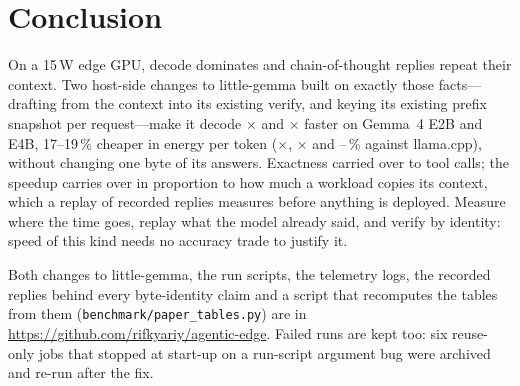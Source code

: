 \documentclass[lettersize,journal]{IEEEtran}
\newcommand{\lc}{llama.cpp}
\newcommand{\lgm}{little-gemma}
\begin{document}
\section{Conclusion}
On a 15\,W edge GPU, decode dominates and chain-of-thought replies repeat
their context. Two host-side changes to \lgm{} built on exactly those
facts---drafting from the context into its existing verify, and keying its
existing prefix snapshot per request---make it decode \EtwoSpG$\times$ and
\EfourSpG$\times$ faster on Gemma~4 E2B and E4B, 17--19\,\% cheaper in energy
per token (\EtwoSpL$\times$, \EfourSpL$\times$ and \EtwoJsav--\EfourJsav\,\%
against \lc{}), without changing one byte of its answers. Exactness carried over to tool calls; the speedup carries
over in proportion to how much a workload copies its context, which a replay of
recorded replies measures before anything is deployed. Measure where the time
goes, replay what the model already said, and verify by identity: speed of this
kind needs no accuracy trade to justify it.

\appendix[Reproducibility]
Both changes to \lgm{}, the run scripts, the telemetry
logs, the recorded replies behind every byte-identity claim and a script that
recomputes the tables from them (\texttt{benchmark/paper\_tables.py}) are in
\url{https://github.com/rifkyariy/agentic-edge}.
Failed runs are kept too: six reuse-only jobs that stopped at start-up on a
run-script argument bug were archived and re-run after the fix.




\end{document}
